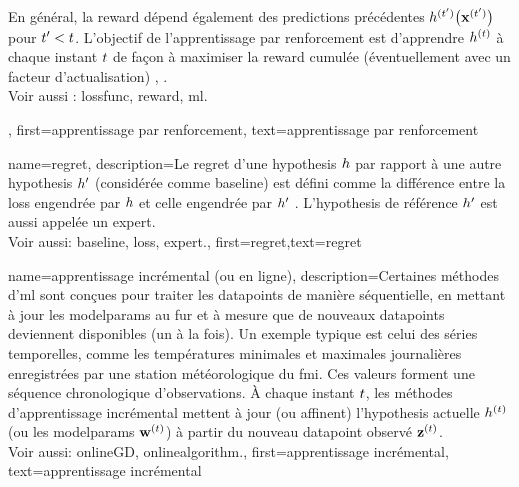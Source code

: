 {{\begin{figure}
\begin{center}
			\end{center}
		\end{figure}
		En général, la \gls{reward} dépend également des \glspl{prediction} précédentes $h^{(t')}\big({\bf x}^{(t')}\big)$ pour $t' < t$. L’objectif de l’apprentissage par renforcement est d’apprendre $h^{(t)}$ à chaque instant $t$ de façon à maximiser la \gls{reward} cumulée (éventuellement avec un facteur d’actualisation) \cite{MLBasics}, \cite{SuttonEd2}.
		\\
		Voir aussi : \gls{lossfunc}, \gls{reward}, \gls{ml}.},
	first={apprentissage par renforcement},
	text={apprentissage par renforcement}
}

{	name={regret},
	description={Le regret d’une \gls{hypothesis} $h$ par rapport à 
		une autre \gls{hypothesis} $h'$ (considérée comme \gls{baseline}) 
		est défini comme la différence entre la \gls{loss} engendrée par $h$ 
		et celle engendrée par $h'$ \cite{PredictionLearningGames}. 
		L'\gls{hypothesis} de référence $h'$ est aussi appelée un \gls{expert}.
		\\ 
		Voir aussi: \gls{baseline}, \gls{loss}, \gls{expert}.},
	first={regret},text={regret}
}

{
	name={apprentissage incrémental (ou en ligne)},
	description={Certaines méthodes d’\gls{ml}  sont conçues pour traiter les \glspl{datapoint} 
		de manière séquentielle, en mettant à jour les \glspl{modelparam} au fur et à mesure que 
		de nouveaux \glspl{datapoint} deviennent disponibles (un à la fois). 
		Un exemple typique est celui des séries temporelles, comme les températures minimales et maximales
		journalières enregistrées par une station météorologique du \gls{fmi}. Ces valeurs forment 
		une séquence chronologique d’observations. À chaque instant $t$, les méthodes d’apprentissage incrémental mettent à jour (ou affinent) l’\gls{hypothesis} actuelle $h^{(t)}$ (ou les \glspl{modelparam} ${\bf w}^{(t)}$) à partir du nouveau \gls{datapoint} observé ${\bf z}^{(t)}$.
		 \\
		Voir aussi: \gls{onlineGD}, \gls{onlinealgorithm}.},
	first={apprentissage incrémental},
	text={apprentissage incrémental}
}

